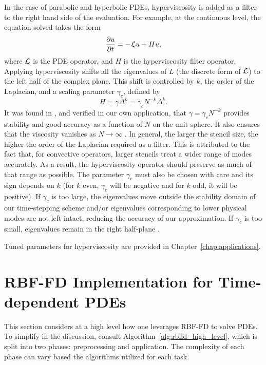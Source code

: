 \documentclass[11pt]{report}
\begin{document}
{In the case of parabolic and hyperbolic PDEs, hyperviscosity is added as a filter to the right hand side of the evaluation. For example, at the continuous level, 
the equation solved takes the form
\begin{equation}
\frac{\partial u}{\partial t} = - \mathcal{L}u + H u,
\label{eq:evaluation_with_hyperviscosity}
\end{equation}
where $\diffop$ is the PDE operator, and $H$ is the hyperviscosity filter operator.
Applying hyperviscosity shifts all the eigenvalues of $L$ (the discrete form of $\mathcal{L}$) to the left half of the complex plane. 
This shift is controlled by $k$, the order of the Laplacian, and a scaling parameter $\gamma_c$, defined by
\begin{equation*}	
H = \gamma \Delta^{k} = \gamma_c N^{-k} \Delta^{k}.
\end{equation*}
It was found in \cite{FlyerLehto11}, and verified in our own application, that $\gamma = \gamma_c N^{-k}$  provides stability and good accuracy 
as a function of $N$ on the unit sphere. It also ensures that the viscosity vanishes as $N\rightarrow\infty$ \cite{FlyerLehto11}.
In general, the larger the stencil size, the higher the order of the Laplacian required as a filter.  This is attributed to the fact that, for convective operators, larger stencils treat a wider range of modes accurately. As a result, the hyperviscosity operator should preserve as much of that range as possible. The parameter $\gamma_c$ must also be chosen with care and its sign depends on $k$ (for $k$ even, $\gamma_c$ will be negative and for $k$ odd, it will be positive). If $\gamma_c$ is too large, the eigenvalues move outside the stability domain of our time-stepping scheme and/or eigenvalues corresponding to lower physical modes are not left intact, reducing the accuracy of our approximation. If $\gamma_c$ is too small, eigenvalues remain in the right half-plane \cite{FornbergLehto11,FlyerLehto11}.

Tuned parameters for hyperviscosity are provided in Chapter~\ref{chap:applications}. 

\section{RBF-FD Implementation for Time-dependent PDEs}

This section considers at a high level how one leverages RBF-FD to solve PDEs. To simplify in the discussion, consult Algorithm~\ref{alg:rbffd_high_level}, which is split into two phases: preprocessing and application. The complexity of each phase can vary based the algorithms utilized for each task. 

}
\end{document}
